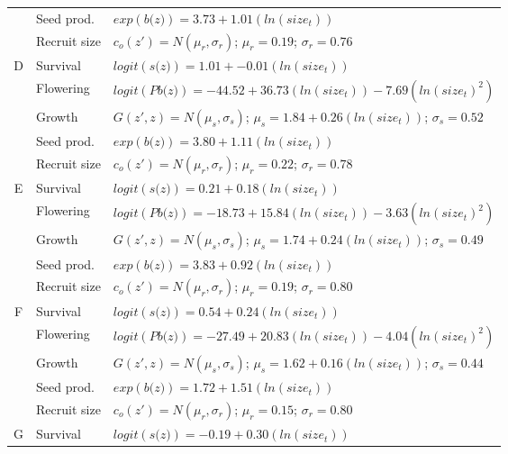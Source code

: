 \documentclass[12pt, letterpaper]{article}
\begin{document}
\begin{spacing}{1.3}
\begin{longtable}[ht!]{c|l|p{}}
         & Seed prod.  & $exp(\textit{b(z)}) = 3.73 + 1.01 (ln(size_t))$  \\
         \rowcolor[gray]{.95}& Recruit size  &  $c_o(z') = N(\mu_r, \sigma_r)$; $\mu_r = 0.19$; $\sigma_r = 0.76$ \\
         \hline
        D &  Survival  &   $logit(\textit{s(z)}) = 1.01 + -0.01 (ln(size_t)) $ \\
         \rowcolor[gray]{.95}& Flowering  & $logit(\textit{Pb(z)})  = -44.52 + 36.73(ln(size_t)) -7.69 (ln(size_t)^2)$ \\
         & Growth  &  $G(z',z) = N(\mu_s, \sigma_s)$; $\mu_s = 1.84 + 0.26(ln(size_t))$; $\sigma_s = 0.52$\\
         \rowcolor[gray]{.95}& Seed prod.  & $exp(\textit{b(z)}) = 3.80 + 1.11 (ln(size_t))$  \\
         & Recruit size  &  $c_o(z') = N(\mu_r, \sigma_r)$; $\mu_r = 0.22$; $\sigma_r = 0.78$ \\
         \hline
        \rowcolor[gray]{.95}E &   Survival  &   $logit(\textit{s(z)})= 0.21 +0.18(ln(size_t))$ \\
         & Flowering  & $logit(\textit{Pb(z)})  = -18.73 + 15.84(ln(size_t)) -3.63 (ln(size_t)^2)$ \\
         \rowcolor[gray]{.95}& Growth  &  $G(z',z) = N(\mu_s, \sigma_s)$; $\mu_s = 1.74 + 0.24(ln(size_t))$; $\sigma_s = 0.49$\\
         & Seed prod.  & $exp(\textit{b(z)}) = 3.83 + 0.92 (ln(size_t))$  \\
         \rowcolor[gray]{.95}& Recruit size  &  $c_o(z') = N(\mu_r, \sigma_r)$; $\mu_r = 0.19$; $\sigma_r = 0.80$ \\
         \hline
        F &  Survival  &   $logit(\textit{s(z)})= 0.54 +0.24(ln(size_t))$ \\
         \rowcolor[gray]{.95}& Flowering  & $logit(\textit{Pb(z)})  = -27.49 + 20.83(ln(size_t)) -4.04 (ln(size_t)^2)$ \\
         & Growth  &  $G(z',z) = N(\mu_s, \sigma_s)$; $\mu_s = 1.62 + 0.16(ln(size_t))$; $\sigma_s = 0.44$\\
         \rowcolor[gray]{.95}& Seed prod.  & $exp(\textit{b(z)}) = 1.72 + 1.51 (ln(size_t))$  \\
         & Recruit size  &  $c_o(z') = N(\mu_r, \sigma_r)$; $\mu_r = 0.15$; $\sigma_r = 0.80$ \\
         \hline
        \rowcolor[gray]{.95}G &  Survival  &  $logit(\textit{s(z)})= -0.19 +0.30(ln(size_t))$ \\

\end{longtable}
\end{spacing}
\end{document}
